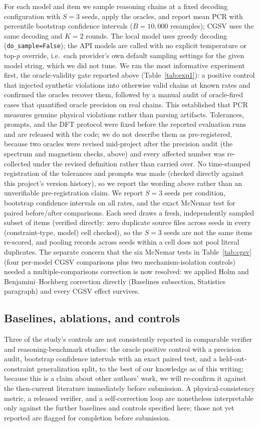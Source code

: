 \documentclass[pdflatex,sn-nature]{sn-jnl}
\begin{document}
For each model and item we sample reasoning chains at a fixed decoding configuration
with $S=3$ seeds, apply the oracles, and report mean PCR with percentile bootstrap
confidence intervals ($B=10{,}000$ resamples); CGSV uses the same decoding and $K=2$
rounds. The local model uses greedy decoding (\texttt{do\_sample=False}); the API models
are called with no explicit temperature or top-$p$ override, i.e.\ each provider's own
default sampling settings for the given model string, which we did not tune. We ran the most informative experiment first, the
oracle-validity gate reported above (Table~\ref{tab:exp1}): a positive control that
injected synthetic violations into otherwise valid chains at known rates and confirmed
the oracles recover them, followed by a manual audit of oracle-fired cases that
quantified oracle precision on real chains. This established that PCR measures genuine
physical violations rather than parsing artifacts. Tolerances, prompts, and the DFT
protocol were fixed before the reported evaluation runs and are released with the code; we
do not describe them as pre-registered, because two oracles were revised mid-project after
the precision audit (the spectrum and magnetism checks, above) and every affected number was
re-collected under the revised definition rather than carried over. No time-stamped
registration of the tolerances and prompts was made (checked directly against this
project's version history), so we report the wording above rather than an unverifiable
pre-registration claim. We report $S=3$
seeds per condition, bootstrap confidence intervals on all rates, and the exact McNemar test
for paired before/after comparisons. Each seed draws a fresh, independently sampled subset of items (verified
directly: zero duplicate source files across seeds in every (constraint-type, model) cell
checked), so the $S=3$ seeds are not the same items re-scored, and pooling records across
seeds within a cell does not pool literal duplicates. The separate concern that the six
McNemar tests in Table~\ref{tab:cgsv} (four per-model CGSV comparisons plus two
mechanism-isolation controls) needed a multiple-comparisons correction is now resolved: we
applied Holm and Benjamini--Hochberg correction directly (Baselines subsection, Statistics
paragraph) and every CGSV effect survives.

\subsection*{Baselines, ablations, and controls}
Three of the study's controls are not consistently reported in comparable
verifier and reasoning-benchmark studies: the oracle positive control with a precision
audit, bootstrap confidence intervals with an exact paired test, and a held-out-constraint
generalization split, to the best of our knowledge as of this writing; because this is a
claim about other authors' work, we will re-confirm it against the then-current literature
immediately before submission.
A physical-consistency metric, a released verifier, and a self-correction loop are
nonetheless interpretable only against the further baselines and controls specified here;
those not yet reported are flagged for completion before submission.
\end{document}
